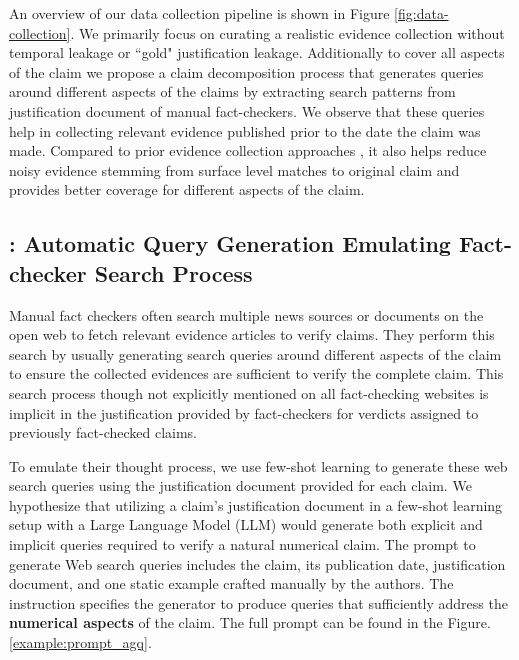 An overview of our data collection pipeline  is shown in Figure \ref{fig:data-collection}. We primarily focus on curating a realistic evidence collection without temporal leakage or ``gold" justification leakage.  Additionally to cover all aspects of the claim we propose a claim decomposition process that generates queries around different aspects of the claims by extracting search patterns from justification document of manual fact-checkers. We observe that these queries help in collecting relevant evidence published prior to the date the claim was made. Compared to prior evidence collection approaches \cite{programFC,claimdecomp,multifc}, it also helps reduce noisy evidence stemming from surface level matches to original claim and provides better coverage for different aspects of the claim.

\subsection{\name{}: Automatic Query Generation Emulating Fact-checker Search Process}
\label{fcdecomp}


Manual fact checkers often search multiple news sources or documents on the open web to fetch relevant evidence articles to verify claims. They perform this search by usually generating search queries around different aspects of the claim to ensure the collected evidences are sufficient to verify the complete claim. This search process though not explicitly mentioned on all fact-checking websites is implicit in the justification provided by fact-checkers for verdicts assigned to previously fact-checked claims.

To emulate their thought process, we use few-shot learning to generate these web search queries using the justification document provided for each claim. We hypothesize that utilizing a claim's justification document in a few-shot learning setup with a Large Language Model (LLM) would generate both explicit and implicit queries required to verify a natural numerical claim. 
The prompt to generate Web search queries includes the claim, its publication date, justification document, and one static example crafted manually by the authors. The instruction specifies the generator to produce queries that sufficiently address the \textbf{numerical aspects} of the claim. The full prompt can be found in the Figure.\ref{example:prompt_agq}. 

